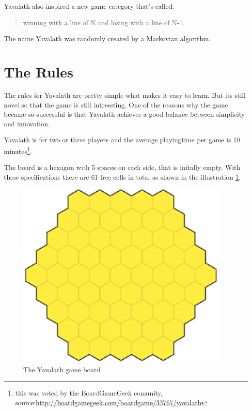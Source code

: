 \documentclass[english]{report}
\begin{document}
Yavalath also inspired a new game category that's called:
\begin{quote}
	winning with a line of N and losing with a line of N-1.
\end{quote}

The name Yavalath was randomly created by a Markovian algorithm.

\section{The Rules}
The rules for Yavalath are pretty simple what makes it easy to learn. But its
still novel so that the game is still intressting. 
One of the reasons why the game became so successful is that Yavalath achieves
a good balance between simplicity and innovation.

Yavalath is for two or three players and the average playingtime per game is 10 minutes\footnote{this was voted by the BoardGameGeek comunity, source:\url{http://boardgamegeek.com/boardgame/33767/yavalath}}.

The board is a hexagon with 5 spaces on each side, that is initally empty.
With these specifications there are 61 free cells in total as shown in the illustration \ref{fig:yav_board}.

\begin{figure}[H]
\centering
\includegraphics[width=0.95\textwidth]{Abbildungen/yav_emptyBoard.png}
\caption[The Yavalath game board, Source:\cite{yvalath}]{The Yavalath game board}
\label{fig:yav_board}
\end{figure}
\end{document}
